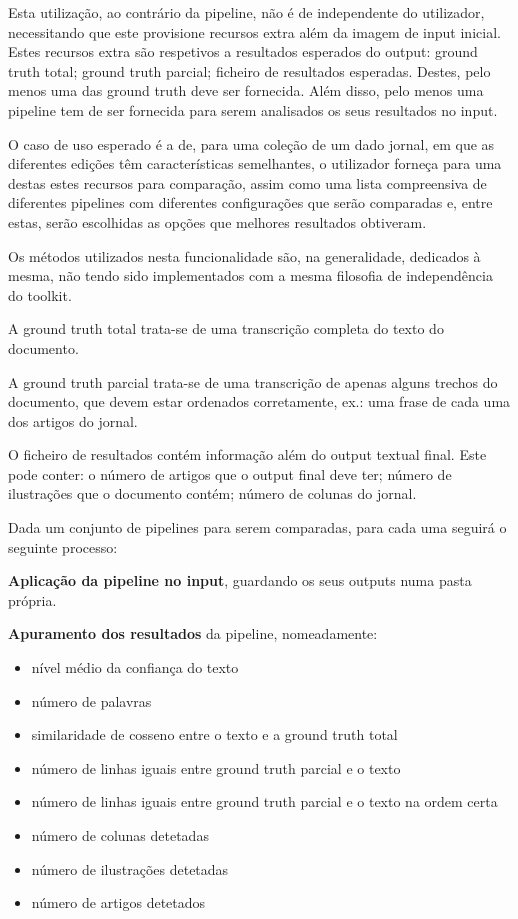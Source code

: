 Esta utilização, ao contrário da pipeline, não é de independente do utilizador, necessitando que este provisione recursos extra além da imagem de input inicial. Estes recursos extra são respetivos a resultados esperados do output: ground truth total; ground truth parcial; ficheiro de resultados esperadas. Destes, pelo menos uma das ground truth deve ser fornecida. Além disso, pelo menos uma pipeline tem de ser fornecida para serem analisados os seus resultados no input.

O caso de uso esperado é a de, para uma coleção de um dado jornal, em que as diferentes edições têm características semelhantes, o utilizador forneça para uma destas estes recursos para comparação, assim como uma lista compreensiva de diferentes pipelines com diferentes configurações que serão comparadas e, entre estas, serão escolhidas as opções que melhores resultados obtiveram.

Os métodos utilizados nesta funcionalidade são, na generalidade, dedicados à mesma, não tendo sido implementados com a mesma filosofia de independência do toolkit.


A ground truth total trata-se de uma transcrição completa do texto do documento.



A ground truth parcial trata-se de uma transcrição de apenas alguns trechos do documento, que devem estar ordenados corretamente, ex.: uma frase de cada uma dos artigos do jornal.


O ficheiro de resultados contém informação além do output textual final. Este pode conter: o número de artigos que o output final deve ter; número de ilustrações que o documento contém; número de colunas do jornal.



Dada um conjunto de pipelines para serem comparadas, para cada uma seguirá o seguinte processo:

\textbf{Aplicação da pipeline no input}, guardando os seus outputs numa pasta própria.

\textbf{Apuramento dos resultados} da pipeline, nomeadamente: 

\begin{itemize}\setlength\itemsep{-0.3em}
	\item nível médio da confiança do texto
	\item número de palavras
	\item similaridade de cosseno entre o texto e a ground truth total
	\item número de linhas iguais entre ground truth parcial e o texto
	\item número de linhas iguais entre ground truth parcial e o texto na ordem certa
	\item número de colunas detetadas
	\item número de ilustrações detetadas
	\item número de artigos detetados
\end{itemize}


